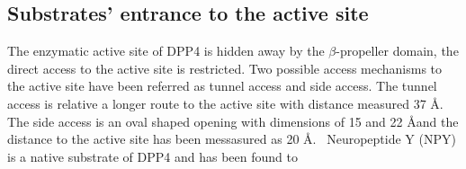 \subsection{Substrates' entrance to the active site}

The enzymatic active site of DPP4 is hidden away by the $\beta$-propeller domain, the direct access to the active site is restricted. Two possible access mechanisms to the active site have been referred as tunnel access and side access. The tunnel access is relative a longer route to the active site with distance measured 37 \AA. The side access is an oval shaped opening with dimensions of 15 and 22 \AA and the distance to the active site has been messasured as 20 \AA.~\cite{Engel_2003, Rasmussen_2002,Weihofen_2004} Neuropeptide Y (NPY) is a native substrate of DPP4 and has been found to  \cite{Aertgeerts_2004}